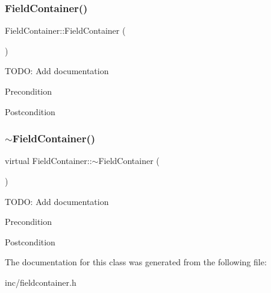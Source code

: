 \subsubsection{\texorpdfstring{FieldContainer()}{FieldContainer()}}
{\footnotesize\ttfamily Field\+Container\+::\+Field\+Container (\begin{DoxyParamCaption}{ }\end{DoxyParamCaption})}

T\+O\+DO\+: Add documentation \begin{DoxyPrecond}{Precondition}

\end{DoxyPrecond}
\begin{DoxyPostcond}{Postcondition}

\end{DoxyPostcond}
\mbox{\label{classFieldContainer_a4e108eb9243a8466a2e3cfa1c45270d1}} 
\subsubsection{\texorpdfstring{$\sim$FieldContainer()}{~FieldContainer()}}
{\footnotesize\ttfamily virtual Field\+Container\+::$\sim$\+Field\+Container (\begin{DoxyParamCaption}{ }\end{DoxyParamCaption})\hspace{0.3cm}{\ttfamily [virtual]}}

T\+O\+DO\+: Add documentation \begin{DoxyPrecond}{Precondition}

\end{DoxyPrecond}
\begin{DoxyPostcond}{Postcondition}

\end{DoxyPostcond}


The documentation for this class was generated from the following file\+:\begin{DoxyCompactItemize}
\item 
inc/fieldcontainer.\+h\end{DoxyCompactItemize}
